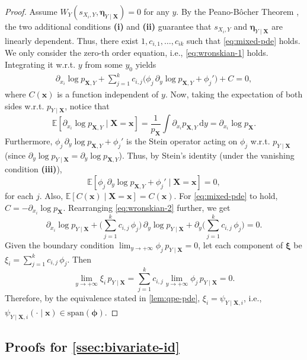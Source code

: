 \documentclass{article}
\theoremstyle{plain}
\theoremstyle{definition}
\theoremstyle{remark}
\begin{document}
\begin{proof}
Assume $W_Y(s_{X_i,Y},\bm{\eta}_{Y\mid\bm{X}})=0$ for any $y$. By the Peano-Bôcher Theorem \citep{Bocher1901}, the two additional conditions  \textbf{(i)} and \textbf{(ii)} guarantee that $s_{X_i,Y}$ and $\bm{\eta}_{Y\mid\bm{X}}$ are linearly dependent. Thus, there exist $1, c_{i,1},\dots,c_{ik}$ such that \cref{eq:mixed-pde} holds. We only consider the zero-th order equation, i.e., \cref{eq:wronskian-1} holds. Integrating it w.r.t. $y$ from some $y_0$ yields
\begin{align}
\label{eq:wronskian-2}
\partial_{x_i}\log p_{\bm{X},Y}+\sum_{j=1}^kc_{i,j}\big(\phi_j\,\partial_y\log p_{\bm{X},Y}+\phi_j'\big)+C=0,
\end{align}
where $C(\bm{x})$ is a function independent of $y$. Now, taking the expectation of both sides w.r.t. $p_{Y\mid\bm{X}}$, notice that
\[\mathbb{E}\left[\partial_{x_i}\log p_{\bm{X},Y}\!\mid\!\bm{X}=\bm{x}\right]=\frac{1}{p_{\bm{X}}}\int\partial_{x_i}p_{\bm{X},Y}\,\text{d}y=\partial_{x_i}\log p_{\bm{X}}.\]
Furthermore, $\phi_j\,\partial_y\log p_{\bm{X},Y}+\phi_j'$ is the Stein operator acting on $\phi_j$ w.r.t. $p_{Y\mid\bm{X}}$ (since $\partial_y\log p_{Y\mid\bm{X}}=\partial_y\log p_{\bm{X},Y}$). Thus, by Stein's identity (under the vanishing condition \textbf{(iii)}),
\[\mathbb{E}\left[\phi_j\,\partial_y\log p_{\bm{X},Y}+\phi_j'\!\mid\!\bm{X}=\bm{x}\right]=0,\]
for each $j$. Also, $\mathbb{E}\left[C(\bm{x})\!\mid\!\bm{X}=\bm{x}\right]=C(\bm{x})$. For \cref{eq:mixed-pde} to hold, $C=-\partial_{x_i}\log p_{\bm{X}}$. Rearranging \cref{eq:wronskian-2} further, we get
\[\partial_{x_i}\log p_{Y\mid\bm{X}}+\bigg(\sum_{j=1}^kc_{i,j}\,\phi_j\bigg)\,\partial_y\log p_{Y\mid\bm{X}}+\partial_y\bigg(\sum_{j=1}^kc_{i,j}\,\phi_j\bigg)=0.\]
Given the boundary condition $\lim_{y\to+\infty}\phi_j\,p_{Y\mid\bm{X}}=0$, let each component of $\bm{\xi}$ be $\xi_i=\sum_{j=1}^kc_{i,j}\,\phi_j$. Then
\[\lim_{y\to+\infty}\xi_i\,p_{Y\mid\bm{X}}=\sum_{j=1}^kc_{i,j}\lim_{y\to+\infty}\phi_j\,p_{Y\mid\bm{X}}=0.\]
Therefore, by the equivalence stated in \cref{lem:qpe-pde}, $\xi_i=\psi_{Y\mid\bm{X},i}$, i.e., $\psi_{Y\mid\bm{X},i}(\cdot\!\mid\!\bm{x})\in\text{span}(\bm{\phi})$.
\end{proof}%
\subsection{Proofs for \cref{ssec:bivariate-id}}
\label{app:a_quantify}

\qpefcmquantifyid*
\end{document}
